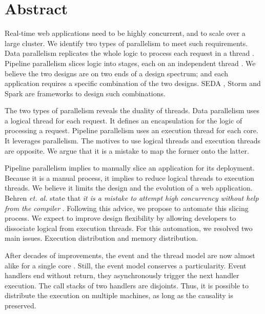 \section*{Abstract}

Real-time web applications need to be highly concurrent, and to scale over a large cluster.
We identify two types of parallelism to meet such requirements.
Data parallelism replicates the whole logic to process each request in a thread \cite{Behren2003}.
Pipeline parallelism slices logic into stages, each on an independent thread \cite{Ousterhout1996}.
We believe the two designs are on two ends of a design spectrum; and each application requires a specific combination of the two designs.
SEDA \cite{Welsh2000}, Storm and Spark are frameworks to design such combinations.

The two types of parallelism reveals the duality of threads.
Data parallelism uses a logical thread for each request.
It defines an encapsulation for the logic of processing a request.
Pipeline parallelism uses an execution thread for each core.
It leverages parallelism.
The motives to use logical threads and execution threads are opposite.
We argue that it is a mistake to map the former onto the latter.

Pipeline parallelism implies to manually slice an application for its deployment.
Because it is a manual process, it implies to reduce logical threads to execution threads.
We believe it limits the design and the evolution of a web application.
Behren \textit{et. al.} state that \textit{it is a mistake to attempt high concurrency without help from the compiler} \cite{Behren2003}.
Following this advice, we propose to automate this slicing process.
We expect to improve design flexibility by allowing developers to dissociate logical from execution threads.
For this automation, we resolved two main issues.
Execution distribution and memory distribution.

After decades of improvements, the event and the thread model are now almost alike for a single core \cite{Adya2002}.
Still, the event model conserves a particularity.
Event handlers end without return, they asynchronously trigger the next handler execution.
The call stacks of two handlers are disjoints.
Thus, it is possible to distribute the execution on multiple machines, as long as the causality is preserved.

